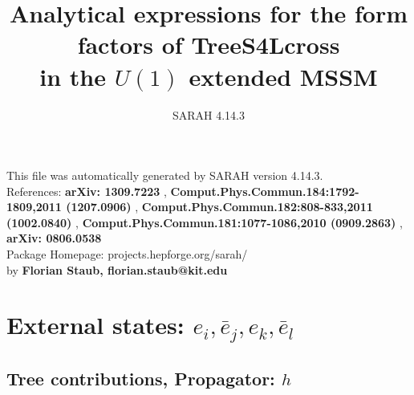 \documentclass[A4,landscape]{article}
\begin{document}
\title{Analytical expressions for the form factors of TreeS4Lcross\\ in the $U(1)$ extended MSSM } 
 \author{SARAH 4.14.3} 
 \maketitle 
 \vspace{10cm} 
This file was automatically generated by SARAH version 4.14.3.  \\ 
References: {\bf arXiv: 1309.7223 }, {\bf Comput.Phys.Commun.184:1792-1809,2011 (1207.0906) }, {\bf Comput.Phys.Commun.182:808-833,2011 (1002.0840) }, {\bf Comput.Phys.Commun.181:1077-1086,2010 (0909.2863) }, {\bf arXiv: 0806.0538 } \\ 
Package Homepage: projects.hepforge.org/sarah/ \\ 
by {\bf Florian Staub, florian.staub@kit.edu} 
 \pagebreak 
 \tableofcontents 
 \pagebreak 
\section{External states: ${e_{{i}}, \bar{e}_{{j}}, e_{{k}}, \bar{e}_{{l}}}$} 
\subsection{Tree contributions, Propagator: $h$} 
\end{document}
